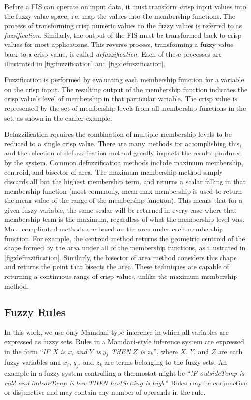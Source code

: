 \documentclass[12pt]{report}
\begin{document}
Before a FIS can operate on input data, it must transform crisp input values into the fuzzy value space, i.e. map the values into the membership functions. The process of transforming crisp numeric values to the fuzzy values is referred to as \emph{fuzzification}. Similarly, the output of the FIS must be transformed back to crisp values for most applications. This reverse process, transforming a fuzzy value back to a crisp value, is called \emph{defuzzification}. Each of these processes are illustrated in \ref{fig:fuzzification} and \ref{fig:defuzzification}. 

Fuzzification is performed by evaluating each membership function for a variable on the crisp input. The resulting output of the membership function indicates the crisp value's level of membership in that particular variable. The crisp value is represented by the set of membership levels from all membership functions in the set, as shown in the earlier example.

Defuzzification rqeuires the combination of multiple membership levels to be reduced to a single crisp value. There are many methods for accomplishing this, and the selection of defuzzification method greatly impacts the results produced by the system. Common defuzzification methods include maximum membership, centroid, and bisector of area. The maximum membership method simply discards all but the highest membership term, and returns a scalar falling in that membership function (most commonly, mean-max membership is used to return the mean value of the range of the membership function). This means that for a given fuzzy variable, the same scalar will be returned in every case where that membership term is the maximum, regardless of what the membership level was. More complicated methods are based on the area under each membership function. For example, the centroid method returns the geometric centroid of the shape formed by the area under all of the membership functions, as illustrated in \ref{fig:defuzzification}. Similarly, the bisector of area method considers this shape and returns the point that bisects the area. These techniques are capable of returning a continuous range of crisp values, unlike the maximum membership method.

\subsection{Fuzzy Rules}

In this work, we use only Mamdani-type inference in which all variables are expressed as fuzzy sets. Rules in a Mamdani-style inference system are expressed in the form ``\emph{IF $X$ is $x_i$ and $Y$ is $y_j$ THEN $Z$ is $z_k$}'', where $X$, $Y$, and $Z$ are each fuzzy variables and $x_i$, $y_j$, and $z_k$ are terms belonging to the fuzzy sets. An example in a fuzzy system controlling a thermostat might be ``\emph{IF outsideTemp is cold and indoorTemp is low THEN heatSetting is high}.'' Rules may be conjunctive or disjunctive and may contain any number of operands in the rule.
\end{document}
